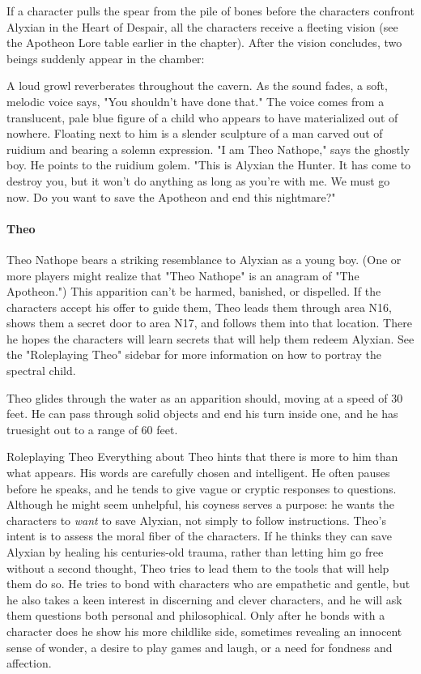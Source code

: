 \documentclass[letterpaper, 11pt, bg=full, twocolumn]{dndbook}
\begin{document}
If a character pulls the spear from the pile of bones before the characters confront Alyxian in the Heart of Despair, all the characters receive a fleeting vision (see the Apotheon Lore table earlier in the chapter). After the vision concludes, two beings suddenly appear in the chamber:

\begin{DndReadAloud}
A loud growl reverberates throughout the cavern. As the sound fades, a soft, melodic voice says, "You shouldn't have done that." The voice comes from a translucent, pale blue figure of a child who appears to have materialized out of nowhere. Floating next to him is a slender sculpture of a man carved out of ruidium and bearing a solemn expression.
"I am Theo Nathope," says the ghostly boy. He points to the ruidium golem. "This is Alyxian the Hunter. It has come to destroy you, but it won't do anything as long as you're with me. We must go now. Do you want to save the Apotheon and end this nightmare?"
\end{DndReadAloud}

\paragraph{Theo}

Theo Nathope bears a striking resemblance to Alyxian as a young boy. (One or more players might realize that "Theo Nathope" is an anagram of "The Apotheon.") This apparition can't be harmed, banished, or dispelled. If the characters accept his offer to guide them, Theo leads them through area N16, shows them a secret door to area N17, and follows them into that location. There he hopes the characters will learn secrets that will help them redeem Alyxian. See the "Roleplaying Theo" sidebar for more information on how to portray the spectral child.

Theo glides through the water as an apparition should, moving at a speed of 30 feet. He can pass through solid objects and end his turn inside one, and he has truesight out to a range of 60 feet.

\begin{DndSidebar}{Roleplaying Theo}
Everything about Theo hints that there is more to him than what appears. His words are carefully chosen and intelligent. He often pauses before he speaks, and he tends to give vague or cryptic responses to questions. Although he might seem unhelpful, his coyness serves a purpose: he wants the characters to \textit{want} to save Alyxian, not simply to follow instructions.
Theo's intent is to assess the moral fiber of the characters. If he thinks they can save Alyxian by healing his centuries-old trauma, rather than letting him go free without a second thought, Theo tries to lead them to the tools that will help them do so. He tries to bond with characters who are empathetic and gentle, but he also takes a keen interest in discerning and clever characters, and he will ask them questions both personal and philosophical. Only after he bonds with a character does he show his more childlike side, sometimes revealing an innocent sense of wonder, a desire to play games and laugh, or a need for fondness and affection.
\end{DndSidebar}
\end{document}
